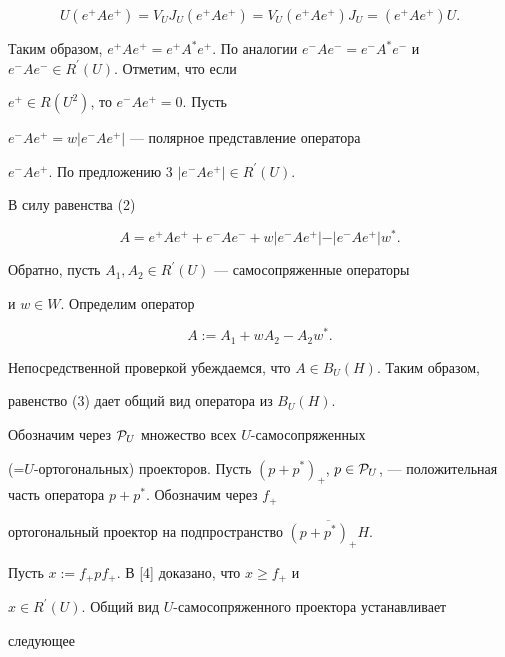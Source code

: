 $$


U(e^{+}Ae^{+})=V_{U}J_{U}(e^{+}Ae^{+})=V_{U}(e^{+}Ae^{+})J_{U}=(e^{+}Ae^{+})U.


$$


Таким образом, $e^{+}Ae^{+}=e^{+}A^{*}e^{+}$. По аналогии $e^{-}Ae^{-}=


e^{-}A^{*}e^{-}$ и $e^{-}Ae^{-}\in R^{\prime}(U)$. Отметим, что если


$e^{+}\in R(U^{2})$, то $e^{-}Ae^{+}=0$. Пусть


$e^{-}Ae^{+}=w\vert e^{-}Ae^{+}\vert$ --- полярное представление оператора


$e^{-}Ae^{+}$. По предложению 3\; $\vert e^{-}Ae^{+}\vert\in R^{\prime}(U)$.


В силу равенства (2)


$$


A=e^{+}Ae^{+}+e^{-}Ae^{-}+w\vert e^{-}Ae^{+}\vert


-\vert e^{-}Ae^{+}\vert w^{*}.


$$





Обратно, пусть $A_{1},A_{2}\in R^{\prime}(U)$ --- самосопряженные операторы


и $w\in W$. Определим оператор


\begin{equation}


A:= A_{1}+wA_{2}-A_{2}w^{*}.


\end{equation}


Непосредственной проверкой убеждаемся, что $A\in B_{U}(H)$. Таким образом,


равенство (3) дает общий вид оператора из $B_{U}(H)$.





Обозначим через ${\cal P}_{U}$ множество всех $U$-самосопряженных


(=$U$-ортогональных) проекторов. Пусть $(p+p^{*})_{+}$, $p\in {\cal


P}_{U}$, --- положительная часть оператора $p+p^{*}$. Обозначим через $f_{+}$


ортогональный проектор на подпространство $\overline{(p+p^{*})_{+}H}$.


Пусть $x:=f_{+}pf_{+}$. В [4] доказано, что $x\geq f_{+}$ и


$x\in R^{\prime}(U)$. Общий вид $U$-самосопряженного проектора устанавливает


следующее





